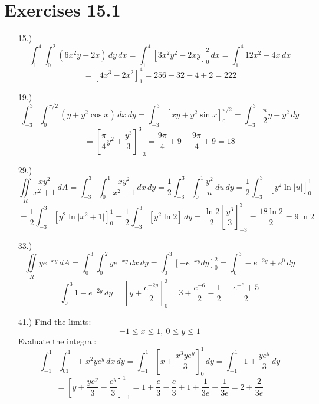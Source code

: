 \documentclass[12pt]{article}
\newcommand{\bracks}[1]{\left[#1\right]}
\begin{document}
\pagestyle{fancy}
\fancyhead{}

\normalsize
\section*{Exercises 15.1}
\begin{itemize}
    \item [15.)] \[\int^4_1\int^2_0\left(6x^2y-2x\right)\,dy\,dx=\int_{1}^{4}\bracks{3x^2y^2-2xy}^2_0\,dx=\int_{1}^{4}12x^2-4x\,dx\]
    \[=\bracks{4x^3-2x^2}^4_1=256-32-4+2=222\]

    \item [19.)] \[\int^3_{-3}\int^{\pi/2}_0(y+y^2\cos x)\,dx\,dy=\int^3_{-3}\bracks{xy+y^2\sin x}^{\pi/2}_0=\int^3_{-3}\frac{\pi}{2}y+y^2\,dy\]
    \[=\bracks{\frac{\pi}{4}y^2+\frac{y^3}{3}}^3_{-3}=\frac{9\pi}{4}+9-\frac{9\pi}{4}+9=18\]

    \item [29.)] \[\iint\limits_R\frac{xy^2}{x^2+1}\,dA=\int^3_{-3}\int^1_0\frac{xy^2}{x^2+1}\,dx\,dy=\frac{1}{2}\int^3_{-3}\int^1_0\frac{y^2}{u}\,du\,dy=\frac{1}{2}\int^3_{-3}\bracks{y^2\ln\vert u\vert}^1_0\]
    \[=\frac{1}{2}\int^3_{-3}\bracks{y^2\ln\vert x^2+1\vert}^1_0=\frac{1}{2}\int^3_{-3}\bracks{y^2\ln2}\,dy=\frac{\ln2}{2}\bracks{\frac{y^3}{3}}^3_{-3}=\frac{18\ln2}{2}=9\ln2\]

    \item [33.)] \[\iint\limits_Rye^{-xy}\,dA=\int^3_0\int^2_0ye^{-xy}\,dx\,dy=\int^3_0\bracks{-e^{-xy}dy}^2_0=\int^3_{0}-e^{-2y}+e^0\,dy\]
    \[\int^3_{0}1-e^{-2y}\,dy=\bracks{y+\frac{e^{-2y}}{2}}^3_0=3+\frac{e^{-6}}{2}-\frac{1}{2}=\frac{e^{-6}+5}{2}\]

    \item [41.)] Find the limits:
    \[-1\leq x\leq1,\ 0\leq y\leq1\]
    Evaluate the integral:
    \[\int^1_{-1}\int^1_01+x^2ye^y\,dx\,dy=\int^1_{-1}\bracks{x+\frac{x^3ye^y}{3}}^1_0\,dy=\int^1_{-1}1+\frac{ye^y}{3}\,dy\]
    \[=\bracks{y+\frac{ye^y}{3}-\frac{e^y}{3}}^1_{-1}=1+\frac{e}{3}-\frac{e}{3}+1+\frac{1}{3e}+\frac{1}{3e}=2+\frac{2}{3e}\]

\end{itemize}
\end{document}
